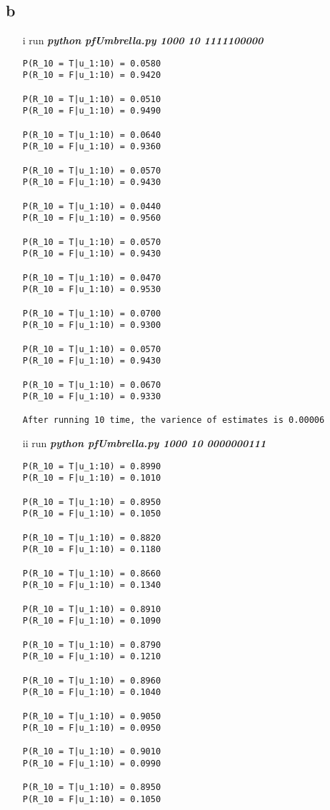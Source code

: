 \documentclass[12pt]{amsart}
\begin{document}
\subsection*{b}
\begin{itemize}
\item[i] run \textit{\textbf{python pfUmbrella.py 1000 10 1111100000}}
\begin{verbatim}
P(R_10 = T|u_1:10) = 0.0580
P(R_10 = F|u_1:10) = 0.9420

P(R_10 = T|u_1:10) = 0.0510
P(R_10 = F|u_1:10) = 0.9490

P(R_10 = T|u_1:10) = 0.0640
P(R_10 = F|u_1:10) = 0.9360

P(R_10 = T|u_1:10) = 0.0570
P(R_10 = F|u_1:10) = 0.9430

P(R_10 = T|u_1:10) = 0.0440
P(R_10 = F|u_1:10) = 0.9560

P(R_10 = T|u_1:10) = 0.0570
P(R_10 = F|u_1:10) = 0.9430

P(R_10 = T|u_1:10) = 0.0470
P(R_10 = F|u_1:10) = 0.9530

P(R_10 = T|u_1:10) = 0.0700
P(R_10 = F|u_1:10) = 0.9300

P(R_10 = T|u_1:10) = 0.0570
P(R_10 = F|u_1:10) = 0.9430

P(R_10 = T|u_1:10) = 0.0670
P(R_10 = F|u_1:10) = 0.9330

After running 10 time, the varience of estimates is 0.00006
\end{verbatim}
\item[ii] run \textit{\textbf{python pfUmbrella.py 1000 10 0000000111}}
\begin{verbatim}
P(R_10 = T|u_1:10) = 0.8990
P(R_10 = F|u_1:10) = 0.1010

P(R_10 = T|u_1:10) = 0.8950
P(R_10 = F|u_1:10) = 0.1050

P(R_10 = T|u_1:10) = 0.8820
P(R_10 = F|u_1:10) = 0.1180

P(R_10 = T|u_1:10) = 0.8660
P(R_10 = F|u_1:10) = 0.1340

P(R_10 = T|u_1:10) = 0.8910
P(R_10 = F|u_1:10) = 0.1090

P(R_10 = T|u_1:10) = 0.8790
P(R_10 = F|u_1:10) = 0.1210

P(R_10 = T|u_1:10) = 0.8960
P(R_10 = F|u_1:10) = 0.1040

P(R_10 = T|u_1:10) = 0.9050
P(R_10 = F|u_1:10) = 0.0950

P(R_10 = T|u_1:10) = 0.9010
P(R_10 = F|u_1:10) = 0.0990

P(R_10 = T|u_1:10) = 0.8950
P(R_10 = F|u_1:10) = 0.1050


\end{verbatim}
\end{itemize}
\end{document}
